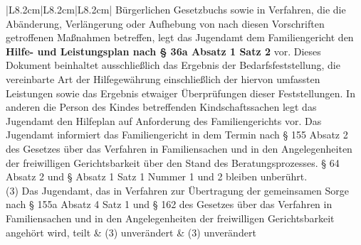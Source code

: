 \documentclass[10pt,a4paper,landscape]{article}
\begin{document}
\begin{longtable}{|L{8.2cm}|L{8.2cm}|L{8.2cm}|}
Bürgerlichen  \newline Gesetzbuchs sowie in Verfahren, die die  \newline Abänderung, Verlängerung oder  \newline Aufhebung von nach diesen Vorschriften  \newline getroffenen Maßnahmen betreffen, legt das  Jugendamt dem Familiengericht den \textbf{Hilfe-  \newline und Leistungsplan nach \S{} 36a Absatz 1  \newline Satz 2} vor. Dieses Dokument beinhaltet  \newline ausschließlich das Ergebnis der  \newline Bedarfsfeststellung, die vereinbarte Art der  \newline Hilfegewährung einschließlich der hiervon  \newline umfassten Leistungen sowie das Ergebnis  \newline etwaiger Überprüfungen dieser  \newline Feststellungen. In anderen die Person des  \newline Kindes betreffenden Kindschaftssachen  \newline legt das Jugendamt den Hilfeplan auf  \newline Anforderung des Familiengerichts vor. Das  \newline Jugendamt informiert das Familiengericht  \newline in dem Termin nach \S{} 155 Absatz 2 des  \newline Gesetzes über das Verfahren in  \newline Familiensachen und in den  \newline Angelegenheiten der freiwilligen  \newline Gerichtsbarkeit über den Stand des  \newline Beratungsprozesses. \S{} 64 Absatz 2 und \S{}   Absatz 1 Satz 1 Nummer 1 und 2  \newline bleiben unberührt. \\
\hhline{|---|}
(3) Das Jugendamt, das in Verfahren zur  \newline Übertragung der gemeinsamen Sorge nach  \newline \S{} 155a Absatz 4 Satz 1 und \S{} 162 des  \newline Gesetzes über das Verfahren in  \newline Familiensachen und in den  \newline Angelegenheiten der freiwilligen  \newline Gerichtsbarkeit angehört wird, teilt & (3) unverändert & (3) unverändert \\

\end{longtable}
\end{document}
